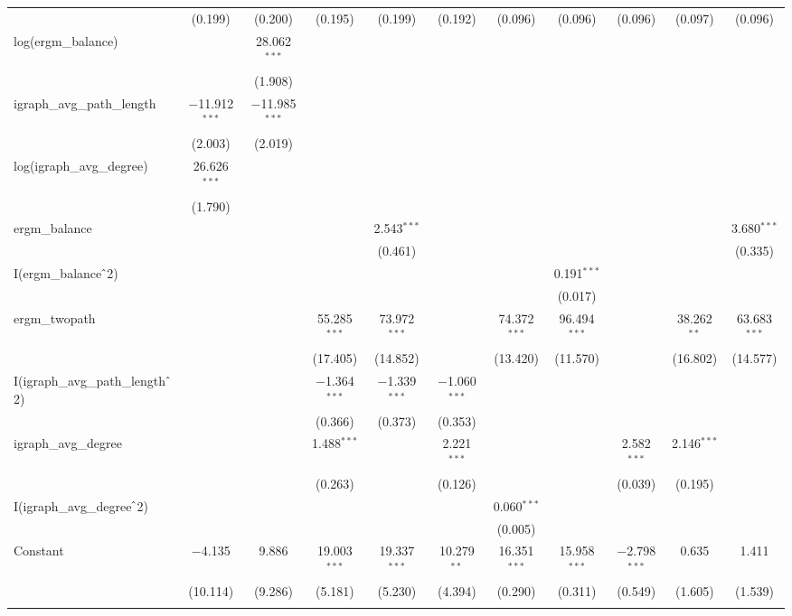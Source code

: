\begin{table}[!htbp]
\begin{tabular}{@{\extracolsep{5pt}}lcccccccccc}
  & (0.199) & (0.200) & (0.195) & (0.199) & (0.192) & (0.096) & (0.096) & (0.096) & (0.097) & (0.096) \\ 
  log(ergm\_balance) &  & 28.062$^{***}$ &  &  &  &  &  &  &  &  \\ 
  &  & (1.908) &  &  &  &  &  &  &  &  \\ 
  igraph\_avg\_path\_length & $-$11.912$^{***}$ & $-$11.985$^{***}$ &  &  &  &  &  &  &  &  \\ 
  & (2.003) & (2.019) &  &  &  &  &  &  &  &  \\ 
  log(igraph\_avg\_degree) & 26.626$^{***}$ &  &  &  &  &  &  &  &  &  \\ 
  & (1.790) &  &  &  &  &  &  &  &  &  \\ 
  ergm\_balance &  &  &  & 2.543$^{***}$ &  &  &  &  &  & 3.680$^{***}$ \\ 
  &  &  &  & (0.461) &  &  &  &  &  & (0.335) \\ 
  I(ergm\_balance$\hat{\mkern6mu}$2) &  &  &  &  &  &  & 0.191$^{***}$ &  &  &  \\ 
  &  &  &  &  &  &  & (0.017) &  &  &  \\ 
  ergm\_twopath &  &  & 55.285$^{***}$ & 73.972$^{***}$ &  & 74.372$^{***}$ & 96.494$^{***}$ &  & 38.262$^{**}$ & 63.683$^{***}$ \\ 
  &  &  & (17.405) & (14.852) &  & (13.420) & (11.570) &  & (16.802) & (14.577) \\ 
  I(igraph\_avg\_path\_length$\hat{\mkern6mu}$2) &  &  & $-$1.364$^{***}$ & $-$1.339$^{***}$ & $-$1.060$^{***}$ &  &  &  &  &  \\ 
  &  &  & (0.366) & (0.373) & (0.353) &  &  &  &  &  \\ 
  igraph\_avg\_degree &  &  & 1.488$^{***}$ &  & 2.221$^{***}$ &  &  & 2.582$^{***}$ & 2.146$^{***}$ &  \\ 
  &  &  & (0.263) &  & (0.126) &  &  & (0.039) & (0.195) &  \\ 
  I(igraph\_avg\_degree$\hat{\mkern6mu}$2) &  &  &  &  &  & 0.060$^{***}$ &  &  &  &  \\ 
  &  &  &  &  &  & (0.005) &  &  &  &  \\ 
  Constant & $-$4.135 & 9.886 & 19.003$^{***}$ & 19.337$^{***}$ & 10.279$^{**}$ & 16.351$^{***}$ & 15.958$^{***}$ & $-$2.798$^{***}$ & 0.635 & 1.411 \\ 
  & (10.114) & (9.286) & (5.181) & (5.230) & (4.394) & (0.290) & (0.311) & (0.549) & (1.605) & (1.539) \\ 
 \hline \\[-1.8ex] 

\end{tabular}
\end{table}
